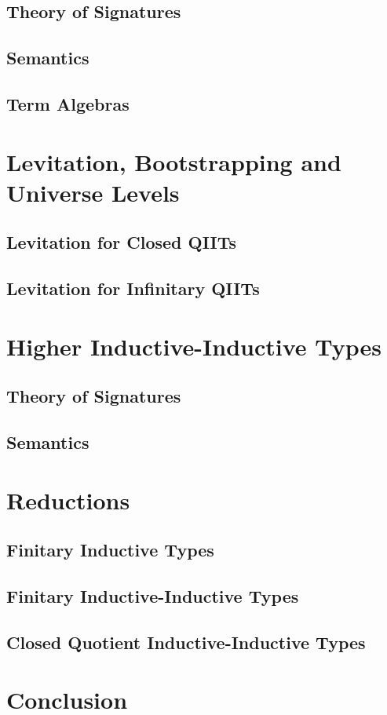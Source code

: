 \documentclass[12pt,a4paper,twoside,openany]{book}
\theoremstyle{remark}
\theoremstyle{definition}
\begin{document}
\section{Theory of Signatures}
\section{Semantics}
\section{Term Algebras}

\chapter{Levitation, Bootstrapping and Universe Levels}
\label{chap:levitation}
\section{Levitation for Closed QIITs}
\section{Levitation for Infinitary QIITs}

\chapter{Higher Inductive-Inductive Types}
\label{chap:hiit}

\section{Theory of Signatures}
\section{Semantics}

\chapter{Reductions}

\section{Finitary Inductive Types}
\section{Finitary Inductive-Inductive Types}
\section{Closed Quotient Inductive-Inductive Types}

\chapter{Conclusion}


\backmatter
\end{document}
